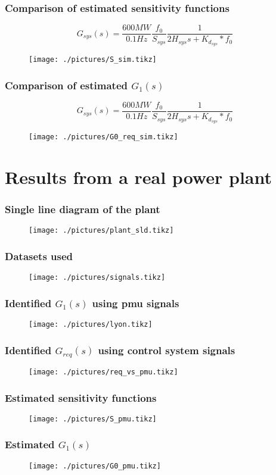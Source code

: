 \begin{frame}
	\frametitle{Comparison of estimated sensitivity functions}
	\begin{equation}\label{eq:G_sys}
		G_{sys}(s) = \frac{600MW}{0.1Hz}\frac{f_0}{S_{sys}}\frac{1}{2H_{sys}s+K_{d_{sys}}*f_0}
\end{equation}
	\begin{figure}
		\texttt{[image: ./pictures/S\_sim.tikz]}
	\end{figure}
\end{frame}
\begin{frame}
		\frametitle{Comparison of estimated $G_1(s)$}
	\begin{equation}\label{eq:G_sys}
		G_{sys}(s) = \frac{600MW}{0.1Hz}\frac{f_0}{S_{sys}}\frac{1}{2H_{sys}s+K_{d_{sys}}*f_0}
\end{equation}
	\begin{figure}
		\texttt{[image: ./pictures/G0\_req\_sim.tikz]}
	\end{figure}
\end{frame}

\section{Results from a real power plant}
\begin{frame}
	\frametitle{Single line diagram of the plant}
	\begin{figure}
			\texttt{[image: ./pictures/plant\_sld.tikz]}
	\end{figure}
\end{frame}
\begin{frame}
	\frametitle{Datasets used}
	\begin{figure}
			\texttt{[image: ./pictures/signals.tikz]}
	\end{figure}
\end{frame}
\begin{frame}
		\frametitle{Identified $G_1(s)$ using pmu signals}
	\begin{figure}
			\texttt{[image: ./pictures/lyon.tikz]}
	\end{figure}
\end{frame}
\begin{frame}
		\frametitle{Identified $G_{req}(s)$ using control system signals}
	\begin{figure}
			\texttt{[image: ./pictures/req\_vs\_pmu.tikz]}
	\end{figure}
\end{frame}
\begin{frame}
	\frametitle{Estimated sensitivity functions}
		\begin{figure}[tb]
			\texttt{[image: ./pictures/S\_pmu.tikz]}
		\end{figure}
\end{frame}
\begin{frame}
	\frametitle{Estimated $G_1(s)$}
		\begin{figure}[tb]
			\texttt{[image: ./pictures/G0\_pmu.tikz]}
		\end{figure}
\end{frame}

